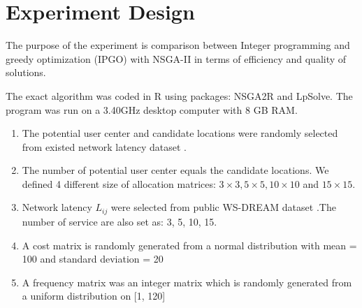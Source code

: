\documentclass{llncs}
\begin{document}
%




\section{Experiment Design}
\label{sec:experiment}
The purpose of the experiment is comparison between Integer programming and greedy optimization (IPGO) with NSGA-II in terms of efficiency and quality of solutions. 

The exact algorithm was coded in R \cite{Morandat:2012:EDR:2367163.2367172} using packages: NSGA2R and LpSolve. The program was run on a 3.40GHz 
desktop computer with 8 GB RAM.

\begin{enumerate}
	\item The potential user center and candidate locations were randomly selected from existed network latency dataset \cite{6076756} \cite{5552800}. 
	\item The number of potential user center equals the candidate locations. We defined 4 different size of allocation matrices:
			$3 \times 3, 5 \times 5, 10 \times 10$ and $15 \times 15$.
		\item Network latency $L_{ij}$ were selected from public WS-DREAM dataset  \cite{6076756} \cite{5552800}.The number of service are also set as: 3, 5, 10, 15.
	\item A cost matrix is randomly generated from a normal distribution with mean = 100 and standard deviation = 20
	\item A frequency matrix was an integer matrix which is randomly generated from a uniform distribution on [1, 120]
\end{enumerate}
\end{document}
